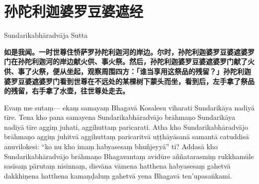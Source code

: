 \section{孙陀利迦婆罗豆婆遮经}

\begin{center}Sundarikabhāradvāja Sutta\end{center}\vspace{1em}

\textbf{如是我闻。一时世尊住㤭萨罗孙陀利迦河的岸边。尔时，孙陀利迦婆罗豆婆遮婆罗门在孙陀利迦河的岸边献火供、事火祭。然后，孙陀利迦婆罗豆婆遮婆罗门献了火供、事了火祭，便从坐起，观察周围四方：「谁当享用这祭品的残留？」孙陀利迦婆罗豆婆遮婆罗门看到世尊在不远处的某棵树下蒙头而坐，看到后，左手拿了祭品的残留，右手拿了水壶，往世尊处走去。}

Evaṃ me sutaṃ— ekaṃ samayaṃ Bhagavā Kosalesu viharati Sundarikāya nadiyā tīre. Tena kho pana samayena Sundarikabhāradvājo brāhmaṇo Sundarikāya nadiyā tīre aggiṃ juhati, aggihuttaṃ paricarati. Atha kho Sundarikabhāradvājo brāhmaṇo aggiṃ juhitvā aggihuttaṃ paricaritvā uṭṭhāyāsanā samantā catuddisā anuvilokesi: “ko nu kho imaṃ habyasesaṃ bhuñjeyyā” ti? Addasā kho Sundarikabhāradvājo brāhmaṇo Bhagavantaṃ avidūre aññatarasmiṃ rukkhamūle sasīsaṃ pārutaṃ nisinnaṃ, disvāna vāmena hatthena habyasesaṃ gahetvā dakkhiṇena hatthena kamaṇḍaluṃ gahetvā yena Bhagavā ten’upasaṅkami.

